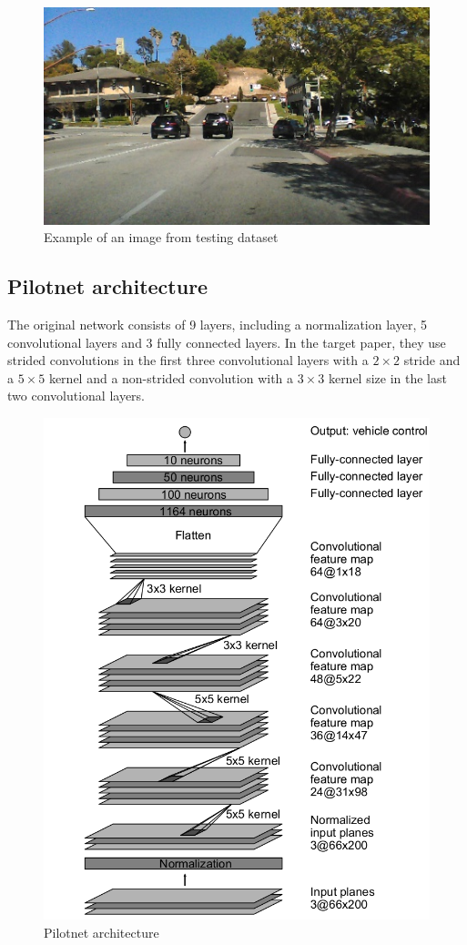 \documentclass[conference]{IEEEtran}
\begin{document}
\begin{figure}[h]
	\begin{center}		
		\includegraphics[width=0.8\linewidth]{fig1.jpg}
	\end{center}
	\caption{Example of an image from testing dataset}
	\label{fig:long1}
\end{figure}

\subsection{Pilotnet architecture}

The original network consists of 9 layers, including a normalization layer, 5 convolutional layers and 3 fully connected layers. In the target paper, they use strided convolutions in the first three convolutional layers with a $2\times 2$ stride and a $5\times 5$ kernel and a non-strided convolution with a $3\times 3$ kernel size in the last two convolutional layers.

\begin{figure}[h]
	\begin{center}		
		\includegraphics[width=0.8\linewidth]{fig2.png}
	\end{center}
	\caption{Pilotnet architecture}
	\label{fig:long2}
\end{figure}
\end{document}
